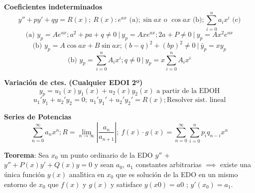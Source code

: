 \documentclass[10pt,landscape,letterpaper]{article}
\begin{document}
\begin{multicols}{3}
\textbf{Coeficientes indeterminados}
\vspace{-5pt}
\[y''+py'+qy=R(x); \ R(x) :  e^{ax} \mbox{ (a)}; \sin{ax} \mbox{ o } \cos{ax}\mbox{ (b)}; \sum_{i=0}^n a_i x^i\mbox{ (c)}\]
\vspace{-8pt}
\[\mbox{(a) } y_p=Ae^{ax}; a^2+pa+q\neq 0 \ \vert \  y_p=Axe^{ax}; 2a+P \neq 0 \ \vert \ y_p=Ax^2e^{ax}\]
\[\mbox{(b) } y_p=A\cos{ax}+B\sin{ax}; (b-q)^2+(bp)^2\neq 0 \ \vert \  \bar{y}_p=x y_p\]
\vspace{-10pt}
\[\mbox{(b) } y_p=\sum_{i=0}^n A_i x^i; q\neq 0 \ \vert \ y_p=x\sum_{i=0}^n A_i x^i\]
\vspace{-6.5pt}

\textbf{Variación de ctes. (Cualquier EDOI 2º)}
\vspace{-5pt}
\[y_p=u_1(x)y_1(x)+u_2(x)y_2(x) \mbox{ a partir de la EDOH}\]
\[u_1'y_1+u_2'y_2=0; \ u_1'y_1'+u_2'y_2'=R(x); \mbox{Resolver sist. lineal}\]

\textbf{Series de Potencias}
\vspace{-5pt}
\[\sum_{n=0}^\infty{a_{n}x^{n}}; R=\lim_{n \to \infty}{\left| \frac{a_{n}}{a_{n+1}} \right|}; \ f(x)\cdot g(x)=\sum_{n=0}^\infty \sum_{i=0}^n{p_{i}q_{n-i}}x^{n} \]
\vspace{-7.5pt}

\textbf{Teorema}: Sea $x_{0}$ un punto ordinario de la EDO $y''$ + $y''+P(x)y'+Q(x)y=0$ y sean $a_{0}$, $a_{1}$ constantes arbitrarias $\implies$ existe una única función $y(x)$ analı́tica en $x_{0}$ que es solución de la EDO en un mismo entorno de $x_{0}$ que $f(x)$ y $g(x)$ y satisface $y(x0) = a0$ ; $y'(x_{0} ) = a_{1}$.
\phantom{ }

\phantom{ }

\phantom{ }

\phantom{ }

\phantom{ }

\phantom{ }

\phantom{ }

\phantom{ }

\phantom{ }


\end{multicols}
\end{document}
